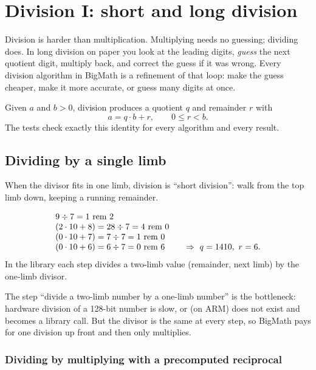 \chapter{Division I: short and long division}
\label{ch:div}

Division is harder than multiplication. Multiplying needs no guessing; dividing does. In
long division on paper you look at the leading digits, \emph{guess} the next quotient digit,
multiply back, and correct the guess if it was wrong. Every division algorithm in BigMath is
a refinement of that loop: make the guess cheaper, make it more accurate, or guess many
digits at once.

Given $a$ and $b > 0$, division produces a quotient $q$ and remainder $r$ with
\[
a = q \cdot b + r, \qquad 0 \le r < b .
\]
The tests check exactly this identity for every algorithm and every result.

\section{Dividing by a single limb}
\label{sec:shortdiv}

When the divisor fits in one limb, division is ``short division'': walk from the top limb
down, keeping a running remainder.

\begin{example}
\[
\begin{array}{l@{\qquad}l}
9 \div 7 = 1 \text{ rem } 2 & \\
(2\cdot 10 + 8) = 28 \div 7 = 4 \text{ rem } 0 & \\
(0 \cdot 10 + 7) = 7 \div 7 = 1 \text{ rem } 0 & \\
(0 \cdot 10 + 6) = 6 \div 7 = 0 \text{ rem } 6 & \Rightarrow\ q = 1410,\ r = 6 .
\end{array}
\]
In the library each step divides a two-limb value (remainder, next limb) by the one-limb
divisor.
\end{example}

The step ``divide a two-limb number by a one-limb number'' is the bottleneck: hardware
division of a 128-bit number is slow, or (on ARM) does not exist and becomes a library call.
But the divisor is the same at every step, so BigMath pays for one division up front and
then only multiplies.

\subsection{Dividing by multiplying with a precomputed reciprocal}

